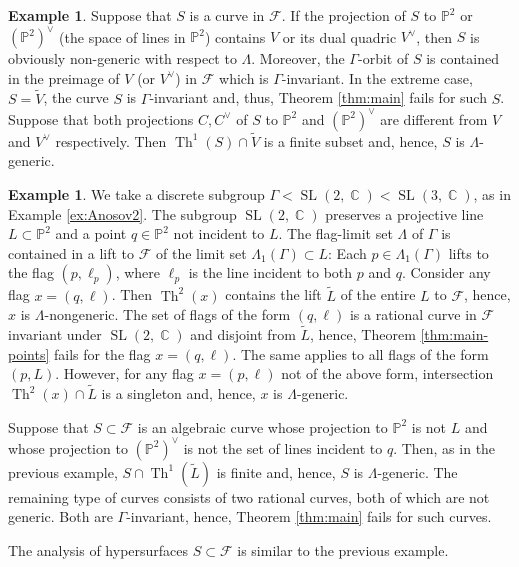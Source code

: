 \documentclass[12pt]{amsbook}%
\theoremstyle{definition}
\newtheorem{example}[thm]{Example}
\theoremstyle{remark}
\numberwithin{section}{chapter}
\numberwithin{subsection}{section}
\numberwithin{figure}{chapter}
\DeclareMathOperator{\C}{\mathbb{C}}
\DeclareMathOperator{\SL}{SL}
\DeclareMathOperator{\Th}{Th}
\def\P{{\mathbb{P}}}
\def\cF{{\mathscr{F}}}
\def\Ga{\Gamma}
\def\La{\Lambda}
\begin{document}
{{\begin{example}
Suppose that $S$ is a curve in $\cF$. If the projection of $S$ to $\P^2$ or $(\P^2)^\vee$ (the space of lines in $\P^2$) contains $V$ or its dual quadric $V^\vee$, then $S$ is obviously non-generic with respect to $\La$. Moreover, the $\Ga$-orbit of $S$ is contained in the preimage of $V$ (or $V^\vee$) 
in $\cF$ which is $\Ga$-invariant. In the extreme case, $S=\tilde V$, the curve $S$ is $\Ga$-invariant and, thus, Theorem \ref{thm:main} fails for such $S$. 
Suppose that both projections $C, C^\vee$ of $S$ to $\P^2$ and $(\P^2)^\vee$ are different from 
$V$ and $V^\vee$ respectively. Then $\Th^1(S)\cap \tilde V$ is a finite subset and, hence, $S$ is $\La$-generic. 
\end{example}


 \begin{example}\label{ex:E2}
 We take a discrete subgroup $\Gamma< \SL(2,\C) < \SL(3,\C)$, as in Example \ref{ex:Anosov2}. The subgroup $\SL(2,\C)$ preserves a projective line 
 $L\subset \P^2$ and a point $q\in \P^2$ not incident to $L$. The flag-limit set $\La$ of $\Ga$ is contained in a lift to $\cF$ 
 of the limit set $\La_1(\Ga)\subset L$: Each $p\in \La_1(\Ga)$ lifts to the flag $(p, \ell_p)$, where $\ell_p$ is the line incident to both $p$ and $q$.  
 Consider any flag $x=(q, \ell)$. Then $\Th^2(x)$ contains the lift $\tilde L$ of the entire $L$ to $\cF$, hence, $x$ is $\La$-nongeneric. The set of flags of the form  $(q,\ell)$ is a rational curve in $\cF$ invariant under $\SL(2,\C)$ and disjoint from $\tilde L$, hence, Theorem \ref{thm:main-points} 
 fails for the flag $x=(q,\ell)$. The same applies to all flags of the form $(p, L)$. However, for any flag $x=(p,\ell)$ not of the above form, intersection 
 $\Th^2(x)\cap \tilde L$ is a singleton and, hence, $x$ is $\La$-generic. 
 
 Suppose that $S\subset \cF$ is an algebraic curve whose projection to $\P^2$ is not $L$ and whose projection to $(\P^2)^\vee$ is not the set of lines incident to $q$. Then, as in the previous example, $S\cap \Th^1(\tilde L)$ is finite and, hence, $S$ is $\La$-generic. The remaining type of curves consists of two rational curves, both of which are not generic. Both are $\Ga$-invariant, hence, Theorem \ref{thm:main} fails for such curves. 
 
 The analysis of hypersurfaces $S\subset \cF$ is similar to the previous example. 
  \end{example}



}}
\end{document}
